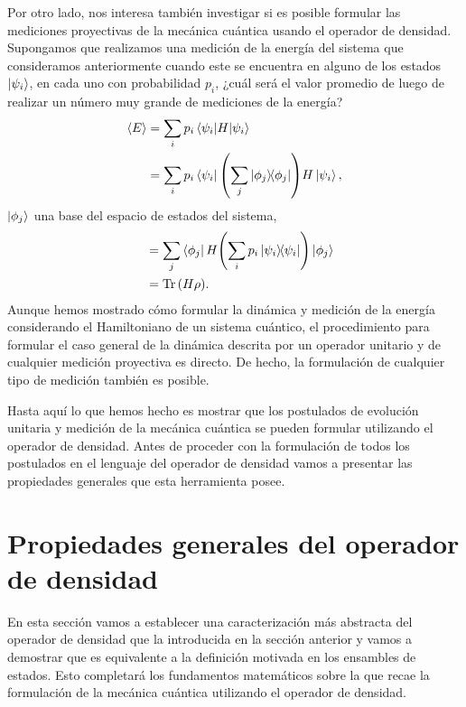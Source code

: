Por otro lado, nos interesa también investigar si es posible formular
las mediciones proyectivas de la mecánica cuántica usando el operador de 
densidad. 
Supongamos que realizamos una medición de la energía del sistema que
consideramos anteriormente cuando este se encuentra en alguno de los 
estados $\ket{\psi_{i} }$, en cada uno con probabilidad $p_i$,
¿cuál será el valor promedio de luego de realizar un número
muy grande de mediciones de la energía?
\begin{align}
	\expval{E} &= \sum_i p_i\matrixel{\psii}{H}{\psii} \\
	&= \sum_i p_i\bra{\psii}\qty(\sum_j \dyad{\phi_j}{\phi_j})H\ket{\psii},
\end{align}
$\ket{\phi_j}$ una base del espacio de estados del sistema,
\begin{align}
	\hspace{3mm}&= \sum_j \bra{\phi_j}H\qty(\sum_i p_i \dyad{\psii}{\psii})\ket{\phi_j} \\
	&= \Tr \qty(H\rho).
\end{align}
Aunque hemos mostrado cómo formular la dinámica y medición de la 
energía considerando el Hamiltoniano de un sistema cuántico, 
el procedimiento para formular el caso general de la dinámica
descrita por un operador unitario y de cualquier medición 
proyectiva es directo. De hecho, la formulación de cualquier tipo
de medición también es posible. 

Hasta aquí lo que hemos hecho es mostrar que los postulados de 
evolución unitaria y medición de la mecánica cuántica 
se pueden formular utilizando el operador de densidad.
Antes de proceder con la formulación de todos los postulados en el 
lenguaje del operador de densidad vamos a presentar las propiedades 
generales que esta herramienta posee. 


\section{Propiedades generales del operador de densidad} %
En esta sección vamos a establecer una caracterización 
más abstracta del operador de densidad que la introducida en 
la sección anterior y vamos a demostrar que es equivalente 
a la definición motivada en los ensambles de estados. 
Esto completará los fundamentos matemáticos
sobre la que recae la formulación de la mecánica cuántica 
utilizando el operador de densidad. 

